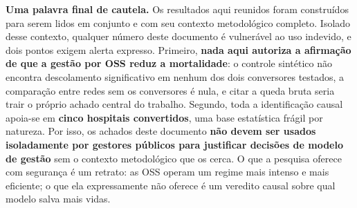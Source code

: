 \textbf{Uma palavra final de cautela.} Os resultados aqui reunidos
foram construídos para serem lidos em conjunto e com seu contexto
metodológico completo. Isolado desse contexto, qualquer número deste
documento é vulnerável ao uso indevido, e dois pontos exigem alerta
expresso. Primeiro, \textbf{nada aqui autoriza a afirmação de que a
gestão por OSS reduz a mortalidade}: o controle sintético não encontra
descolamento significativo em nenhum dos dois conversores testados, a
comparação entre redes sem os conversores é nula, e citar a queda
bruta seria trair o próprio achado central do trabalho. Segundo, toda a
identificação causal apoia-se em \textbf{cinco hospitais convertidos},
uma base estatística frágil por natureza. Por isso, os achados deste
documento \textbf{não devem ser usados isoladamente por gestores
públicos para justificar decisões de modelo de gestão} sem o contexto
metodológico que os cerca. O que a pesquisa oferece com segurança é um
retrato: as OSS operam um regime mais intenso e mais eficiente; o que
ela expressamente não oferece é um veredito causal sobre qual modelo
salva mais vidas.
